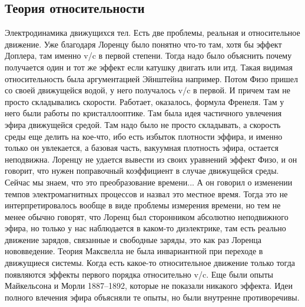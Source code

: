 \documentclass[a4paper, 12pt]{article}
\begin{document}
\subsection{Теория относительности}

Электродинамика движущихся тел. Есть две проблемы, реальная 
и относительное движение. Уже благодаря Лоренцу было понятно что-то там, 
хотя бы эффект Доплера, там именно v/c в первой степени. Тогда надо было 
объяснить почему получается один и тот же эффект если катушку двигать 
или итд. Такая видимая относительность была аргументацией Эйнштейна 
например. Потом Физо пришел со своей движущейся водой, у него получалось 
v/c в первой. И причем там не просто складывались скорости. Работает, 
оказалось, формула Френеля. Там у него были работы по кристаллооптике. 
Там была идея частичного увлечения эфира движущейся средой. Там надо 
было не просто складывать, а скорость среды еще делить на кое-что, ибо 
есть избыток плотности эффира, и именно только он увлекается, а базовая 
часть, вакуумная плотность эфира, остается неподвижна. Лоренцу не 
удается вывести из своих уравнений эффект Физо, и он говорит, что нужен 
поправочный коэффициент в случае движущейся среды. Сейчас мы знаем, что 
это преобразование времени... А он говорил о изменении темпов 
электромагнитных процессов и назвал это местное время. Тогда это не 
интерпретировалось вообще в виде проблемы измерения времени, но тем не 
менее обычно говорят, что Лоренц был сторонником абсолютно неподвижного 
эфира, но только у нас наблюдается в каком-то диэлектрике, там есть 
реально движение зарядов, связанные и свободные заряды, это как раз 
Лоренца нововведение. Теория Максвелла не была инвариантной при переходе 
в движущиеся системы. Когда есть какое-то относительное движение только 
тогда появляются эффекты первого порядка относительно v/c. Еще были 
опыты Майкельсона и Морли 1887--1892, которые не показали никакого 
эффекта. Идеи полного влечения эфира объясняли те опыты, но были 
внутренне противоречивы.
\end{document}
